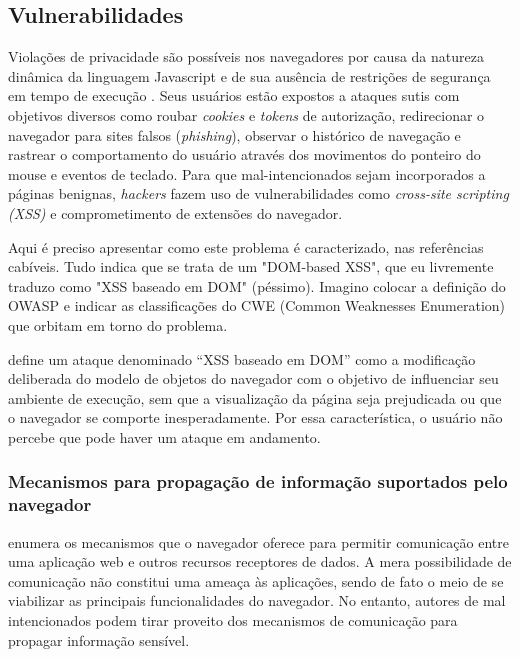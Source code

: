 \subsection{Vulnerabilidades}
Violações de privacidade são possíveis nos navegadores por causa da natureza dinâmica da linguagem Javascript e de sua ausência de restrições de segurança em tempo de execução \cite{Jang2010}. Seus usuários estão expostos a ataques sutis com objetivos diversos como roubar \textit{cookies} e \textit{tokens} de autorização, redirecionar o navegador para sites falsos (\textit{phishing}), observar o histórico de navegação e rastrear o comportamento do usuário através dos movimentos do ponteiro do mouse e eventos de teclado. Para que {\scripts} mal-intencionados sejam incorporados a páginas benignas, \textit{hackers} fazem uso de vulnerabilidades como \textit{cross-site scripting (XSS)} \cite{OWASP:XSS} e comprometimento de extensões \cite{Heule2015_Most_Dangerous_Code} do navegador.

\begin{todo}
Aqui é preciso apresentar como este problema é caracterizado, nas referências cabíveis. Tudo indica que se trata de um "DOM-based XSS", que eu livremente traduzo como "XSS baseado em DOM" (péssimo). Imagino colocar a definição do OWASP e indicar as classificações do CWE (Common Weaknesses Enumeration) que orbitam em torno do problema.
\end{todo}

\cite{OWASP:DOMXSS} define um ataque denominado ``XSS baseado em DOM'' como a modificação deliberada do modelo de objetos do navegador com o objetivo de influenciar seu ambiente de execução, sem que a visualização da página seja prejudicada ou que o navegador se comporte inesperadamente. Por essa característica, o usuário não percebe que pode haver um ataque em andamento.

\subsubsection{Mecanismos para propagação de informação suportados pelo navegador}
\label{Secao: Vulnerabilidades_MecanismosPropagacao}
 enumera os mecanismos que o navegador oferece para permitir comunicação entre uma aplicação web e outros recursos receptores de dados. A mera possibilidade de comunicação não constitui uma ameaça às aplicações, sendo de fato o meio de se viabilizar as principais funcionalidades do navegador. No entanto, autores de \scripts{} mal intencionados podem tirar proveito dos mecanismos de comunicação para propagar informação sensível.

